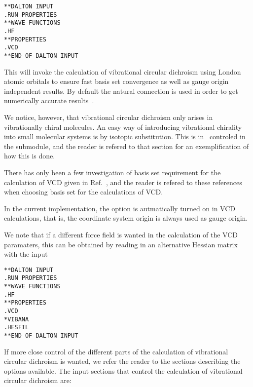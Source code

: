 \begin{verbatim}
**DALTON INPUT
.RUN PROPERTIES
**WAVE FUNCTIONS
.HF
**PROPERTIES
.VCD
**END OF DALTON INPUT
\end{verbatim}

This will invoke the calculation of vibrational circular dichroism
using London atomic orbitals to ensure fast
basis set convergence as 
well as gauge origin independent results. By
default the natural 
connection is used in order to get
numerically accurate
results~\cite{joklbkrthpjtca90,krthjopjklbcpl235}.

We notice, however, that vibrational circular dichroism only arises in
vibrationally chiral molecules. An easy way of introducing
vibrational chirality into small molecular systems is by isotopic
substitution. This is in 
\siraba\ controled in the  submodule, and the reader is
refered to that section for an exemplification of how this is done. 

There has only  been a few investigation of basis set requirement for
the calculation of VCD given in
Ref.~\cite{klbpjthkrhjajjcp100,klbpjthkrfd99}, 
and the reader is refered to these references when choosing basis set
for the calculations of VCD. 

In the current implementation, the  option is autmatically
turned on in VCD calculations, that is, the coordinate system origin
is always used as gauge origin.

We note that if a different force field is wanted in the calculation
of the VCD paramaters, this can be obtained by reading in an
alternative Hessian matrix with the input

\begin{verbatim}
**DALTON INPUT
.RUN PROPERTIES
**WAVE FUNCTIONS
.HF
**PROPERTIES
.VCD
*VIBANA
.HESFIL
**END OF DALTON INPUT
\end{verbatim}

If more close control of the different parts of the calculation of
vibrational circular dichroism is wanted, we refer the reader to the
sections describing the options available. The input sections that control
the calculation of vibrational circular dichroism are:

